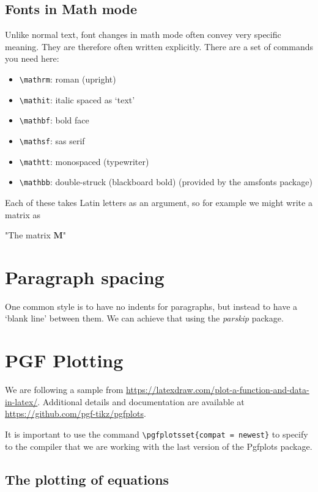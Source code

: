 \documentclass[12]{article}
\begin{document}
    \subsection{Fonts in Math mode}%
    \label{sub:fonts-in-math}
    
    Unlike normal text, font changes in math mode often convey very specific meaning. They are therefore often written explicitly. There are a set of commands you need here:
    \begin{itemize}
        \item \verb|\mathrm|: roman (upright)
        \item \verb|\mathit|: italic spaced as ‘text’
        \item \verb|\mathbf|: bold face
        \item \verb|\mathsf|: sas serif
        \item \verb|\mathtt|: monospaced (typewriter)
        \item \verb|\mathbb|: double-struck (blackboard bold) (provided by the amsfonts package)
    \end{itemize}

    Each of these takes Latin letters as an argument, so for example we might write a matrix as

    "The matrix $\mathbf{M}$"

    \section{Paragraph spacing}%
    \label{sec:para-space}
    One common style is to have no indents for paragraphs, but instead to have a ‘blank line’ between them. We can achieve that using the \textit{parskip} package.

    \lipsum[1]

    \section{PGF Plotting}%
    \label{sec:pdf-plotting}
    We are following a sample from \url{https://latexdraw.com/plot-a-function-and-data-in-latex/}. Additional details and documentation are available at \url{https://github.com/pgf-tikz/pgfplots}.

    It is important to use the command \verb|\pgfplotsset{compat = newest}| to specify to the compiler that we are working with the last version of the Pgfplots package.

    \subsection{The plotting of equations}%
    \label{sub:plotting-figures}
    
\end{document}
